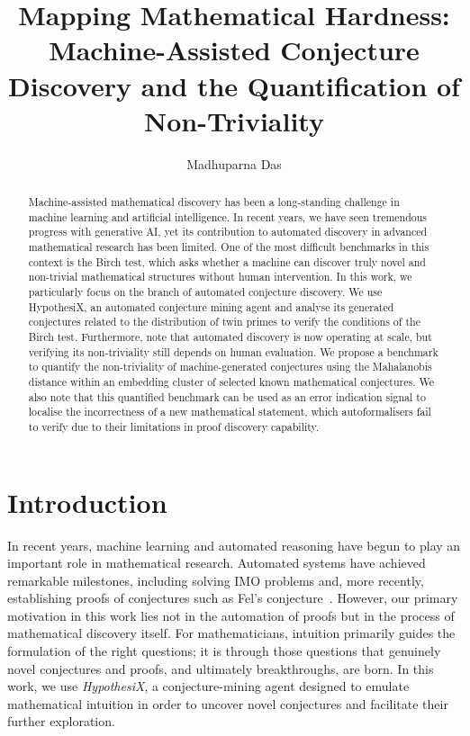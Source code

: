 \documentclass[11pt,reqno]{amsart}
\title{\textnormal{Mapping Mathematical Hardness: Machine-Assisted Conjecture Discovery and the Quantification of Non-Triviality}}
\author{Madhuparna Das}
\date{}
\theoremstyle{plain}\newtheorem{theorem}{Theorem}[section]
\numberwithin{equation}{section}
\begin{document}
\begin{abstract}
Machine-assisted mathematical discovery has been a long-standing challenge in machine learning and artificial intelligence. In recent years, we have seen tremendous progress with generative AI, yet its contribution to automated discovery in advanced mathematical research has been limited. One of the most difficult benchmarks in this context is the Birch test, which asks whether a machine can discover truly novel and non-trivial mathematical structures without human intervention. In this work, we particularly focus on the branch of automated conjecture discovery. We use HypothesiX, an automated conjecture mining agent and analyse its generated conjectures related to the distribution of twin primes to verify the conditions of the Birch test. Furthermore, note that automated discovery is now operating at scale, but verifying its non-triviality still depends on human evaluation. We propose a benchmark to quantify the non-triviality of machine-generated conjectures using the Mahalanobis distance within an embedding cluster of selected known mathematical conjectures. We also note that this quantified benchmark can be used as an error indication signal to localise the incorrectness of a new mathematical statement, which autoformalisers fail to verify due to their limitations in proof discovery capability.
\end{abstract}

\maketitle
\tableofcontents
\section{Introduction}
\noindent
In recent years, machine learning and automated reasoning have begun to play an important role in mathematical research. Automated systems have achieved remarkable milestones, including solving IMO problems and, more recently, establishing proofs of conjectures such as Fel's conjecture~\cite{axiommath,alphaproof,aristotle}. However, our primary motivation in this work lies not in the automation of proofs but in the process of mathematical discovery itself. For mathematicians, intuition primarily guides the formulation of the right questions; it is through those questions that genuinely novel conjectures and proofs, and ultimately breakthroughs, are born. In this work, we use {\it HypothesiX}, a conjecture-mining agent designed to emulate mathematical intuition in order to uncover novel conjectures and facilitate their further exploration. 
\end{document}
